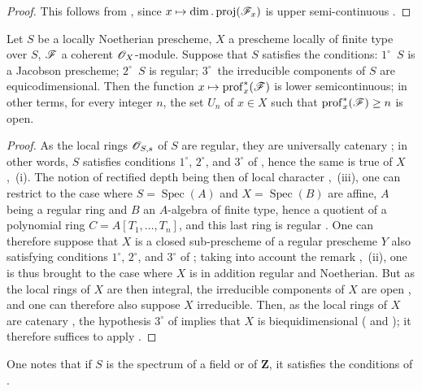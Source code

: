 \begin{proof}
This follows from , since $x\mapsto\dim.\operatorname{proj}(\mathscr{F}_x)$ is upper semi-continuous .
\end{proof}

\begin{proposition}[10.8.5]
\label{IV.10.8.5}
Let $S$ be a locally Noetherian prescheme, $X$ a prescheme locally of finite type over $S$, $\mathscr{F}$ a coherent $\mathscr{O}_X$-module.
Suppose that $S$ satisfies the conditions: $1^\circ$~$S$ is a Jacobson prescheme; $2^\circ$~$S$ is regular; $3^\circ$~the irreducible components of $S$ are equicodimensional.
Then the function $x\mapsto\operatorname{prof}^*_x(\mathscr{F})$ is lower semicontinuous; in other terms, for every integer $n$, the set $U_n$ of $x\in X$ such that $\operatorname{prof}^*_x(\mathscr{F})\geq n$ is open.
\end{proposition}

\begin{proof}
As the local rings $\mathscr{O}_{S,s}$ of $S$ are regular, they are universally catenary ; in other words, $S$ satisfies conditions $1^\circ$, $2^\circ$, and $3^\circ$ of , hence the same is true of $X$ ,~(i).
The notion of rectified depth being then of local character ,~(iii), one can restrict to the case where $S=\operatorname{Spec}(A)$ and $X=\operatorname{Spec}(B)$ are affine, $A$ being a regular ring and $B$ an $A$-algebra of finite type, hence a quotient of a polynomial ring $C=A[T_1,\ldots,T_n]$, and this last ring is regular .
One can therefore suppose that $X$ is a closed sub-prescheme of a regular prescheme $Y$ also satisfying conditions $1^\circ$, $2^\circ$, and $3^\circ$ of ; taking into account the remark ,~(ii), one is thus brought to the case where $X$ is in addition regular and Noetherian.
But as the local rings of $X$ are then integral, the irreducible components of $X$ are
open , and one can therefore also suppose $X$ irreducible.
Then, as the local rings of $X$ are catenary , the hypothesis $3^\circ$ of  implies that $X$ is biequidimensional ( and ); it therefore suffices to apply .
\end{proof}

One notes that if $S$ is the spectrum of a field or of $\mathbf{Z}$, it satisfies the conditions of .

